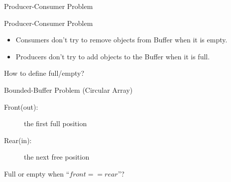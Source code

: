 \begin{frame}{Producer-Consumer Problem}
\begin{center}
\end{center}
\end{frame}

\begin{frame}{Producer-Consumer Problem}
  \begin{itemize}
  \item Consumers don't try to remove objects from Buffer when it is empty.
  \item Producers don't try to add objects to the Buffer when it is full.
  \end{itemize}
  \begin{center}
  \end{center}
  \begin{center}
    How to define \alert{full/empty}?
  \end{center}
\end{frame}

\begin{frame}{Bounded-Buffer Problem (Circular Array)}
  \begin{minipage}{.65\linewidth}
  \begin{description}
  \item[Front(out):] the first full position
  \item[Rear(in):] the next free position
  \end{description}
  \end{minipage}\quad
  \begin{minipage}{.3\linewidth}
  \end{minipage}
  Full or empty when ``$front == rear$''?
\end{frame}

